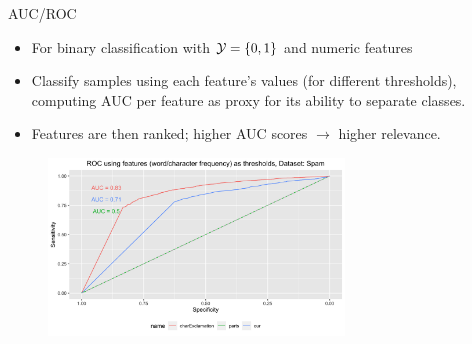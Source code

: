 \documentclass[11pt,compress,t,notes=noshow, xcolor=table]{beamer}
\begin{document}
  \begin{vbframe}{AUC/ROC}
  \begin{itemize}
    \item For binary classification with $\mathcal{Y} = \{ 0, 1\}$ and numeric features
    \item Classify samples using each feature's values (for different thresholds), computing AUC per feature as proxy for its ability to separate classes. 
    \item Features are then ranked; higher AUC scores $\to$ higher relevance.
    \end{itemize}
   \begin{center}
   \begin{figure}
     \includegraphics[width=0.7\textwidth]{figure/fs-roc-curve.png}
   \end{figure}

   \end{center}
   \end{vbframe}
\end{document}
